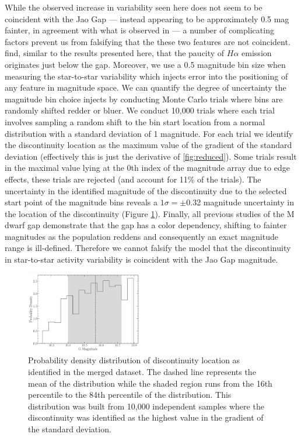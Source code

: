 While the observed increase in variability seen here does not seem to be
coincident with the Jao Gap --- instead appearing to be approximately 0.5 mag
fainter, in agreement with what is observed in \citet{Jao2023} --- a number of
complicating factors prevent us from falsifying that the these two features are
not coincident. \citeauthor{Jao2023} find, similar to the results presented
here, that the paucity of $H\alpha$ emission originates just below the gap.
Moreover, we use a 0.5 magnitude bin size when measuring the star-to-star
variability which injects error into the positioning of any feature in
magnitude space. We can quantify the degree of uncertainty the magnitude bin
choice injects by conducting Monte Carlo trials where bins are randomly shifted
redder or bluer. We conduct 10,000 trials where each trial involves sampling a
random shift to the bin start location from a normal distribution with a
standard deviation of 1 magnitude. For each trial we identify the discontinuity
location as the maximum value of the gradient of the standard deviation
(effectively this is just the derivative of \ref{fig:reduced}). Some trials
result in the maximal value lying at the 0th index of the magnitude array due
to edge effects, these trials are rejected (and account for 11\% of the
trials). The uncertainty in the identified magnitude of the discontinuity due
to the selected start point of the magnitude bins reveals a $1\sigma = \pm$0.32
magnitude uncertainty in the location of the discontinuity (Figure
\ref{fig:GapLocationMC}). Finally, all previous studies of the M dwarf gap
\citep{Jao2018, Feiden2022, Mansfield2021, Boudreaux2022, Jao2023} demonstrate
that the gap has a color dependency, shifting to fainter magnitudes as the
population reddens and consequently an exact magnitude range is ill-defined.
Therefore we cannot falsify the model that the discontinuity in star-to-star activity
variability is coincident with the Jao Gap magnitude.

\begin{figure}
  \centering
  \includegraphics[width=0.45\textwidth]{figures/jaoMagActivity/GapLocationMC.pdf}
  \caption{Probability density distribution of discontinuity location as
  identified in the merged dataset. The dashed line represents the mean of the
  distribution while the shaded region runs from the 16th percentile to the
  84th percentile of the distribution. This distribution was built from 10,000
  independent samples where the discontinuity was identified as the highest
  value in the gradient of the standard deviation.}
  \label{fig:GapLocationMC}
\end{figure}

